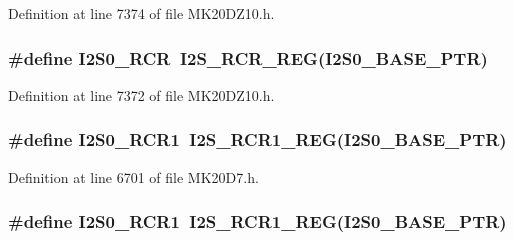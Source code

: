 Definition at line 7374 of file M\+K20\+D\+Z10.\+h.

\subsubsection[{\texorpdfstring{I2\+S0\+\_\+\+R\+CR}{I2S0_RCR}}]{\setlength{\rightskip}{0pt plus 5cm}\#define I2\+S0\+\_\+\+R\+CR~{\bf I2\+S\+\_\+\+R\+C\+R\+\_\+\+R\+EG}({\bf I2\+S0\+\_\+\+B\+A\+S\+E\+\_\+\+P\+TR})}\hypertarget{group___i2_s___register___accessor___macros_ga159018666c1da85d05651256c7543cff}{}\label{group___i2_s___register___accessor___macros_ga159018666c1da85d05651256c7543cff}


Definition at line 7372 of file M\+K20\+D\+Z10.\+h.

\subsubsection[{\texorpdfstring{I2\+S0\+\_\+\+R\+C\+R1}{I2S0_RCR1}}]{\setlength{\rightskip}{0pt plus 5cm}\#define I2\+S0\+\_\+\+R\+C\+R1~{\bf I2\+S\+\_\+\+R\+C\+R1\+\_\+\+R\+EG}({\bf I2\+S0\+\_\+\+B\+A\+S\+E\+\_\+\+P\+TR})}\hypertarget{group___i2_s___register___accessor___macros_ga4f600718409f2491f8d85d5154a5dc9c}{}\label{group___i2_s___register___accessor___macros_ga4f600718409f2491f8d85d5154a5dc9c}


Definition at line 6701 of file M\+K20\+D7.\+h.

\subsubsection[{\texorpdfstring{I2\+S0\+\_\+\+R\+C\+R1}{I2S0_RCR1}}]{\setlength{\rightskip}{0pt plus 5cm}\#define I2\+S0\+\_\+\+R\+C\+R1~{\bf I2\+S\+\_\+\+R\+C\+R1\+\_\+\+R\+EG}({\bf I2\+S0\+\_\+\+B\+A\+S\+E\+\_\+\+P\+TR})}\hypertarget{group___i2_s___register___accessor___macros_ga4f600718409f2491f8d85d5154a5dc9c}{}\label{group___i2_s___register___accessor___macros_ga4f600718409f2491f8d85d5154a5dc9c}


